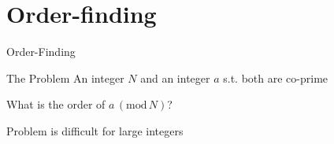 \documentclass{beamer}
\begin{document}
\section{Order-finding}

\begin{frame}{Order-Finding}
        \begin{block}{The Problem}
                An integer $N$ and an integer
                $a$ s.t. both are co-prime

                What is the order of $a \, (\mathrm{mod} \, N)$?
        \end{block}

        \pause
        Problem is difficult for large integers
\end{frame}
\end{document}

